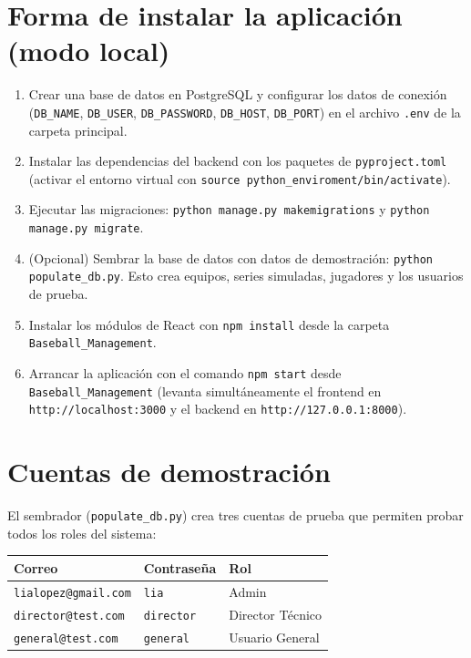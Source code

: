 \documentclass{report}
\begin{document}
    \section*{Forma de instalar la aplicación (modo local)}
    \begin{enumerate}
        \item Crear una base de datos en PostgreSQL y configurar los datos de conexión
        (\texttt{DB\_NAME}, \texttt{DB\_USER}, \texttt{DB\_PASSWORD}, \texttt{DB\_HOST}, \texttt{DB\_PORT})
        en el archivo \texttt{.env} de la carpeta principal.
        \item Instalar las dependencias del backend con los paquetes de \texttt{pyproject.toml}
        (activar el entorno virtual con \texttt{source python\_enviroment/bin/activate}).
        \item Ejecutar las migraciones:
        \texttt{python manage.py makemigrations} y \texttt{python manage.py migrate}.
        \item (Opcional) Sembrar la base de datos con datos de demostración:
        \texttt{python populate\_db.py}. Esto crea equipos, series simuladas, jugadores y los usuarios
        de prueba.
        \item Instalar los módulos de React con \texttt{npm install} desde la carpeta
        \texttt{Baseball\_Management}.
        \item Arrancar la aplicación con el comando \texttt{npm start} desde \texttt{Baseball\_Management}
        (levanta simultáneamente el frontend en \texttt{http://localhost:3000} y el backend en
        \texttt{http://127.0.0.1:8000}).
    \end{enumerate}

    \section*{Cuentas de demostración}
    El sembrador (\texttt{populate\_db.py}) crea tres cuentas de prueba que permiten probar todos los
    roles del sistema:

    \begin{center}
    \begin{tabular}{lll}
        \toprule
        \textbf{Correo} & \textbf{Contraseña} & \textbf{Rol} \\
        \midrule
        \texttt{lialopez@gmail.com} & \texttt{lia} & Admin \\
        \texttt{director@test.com} & \texttt{director} & Director Técnico \\
        \texttt{general@test.com} & \texttt{general} & Usuario General \\
        \bottomrule
    \end{tabular}
    \end{center}
\end{document}
